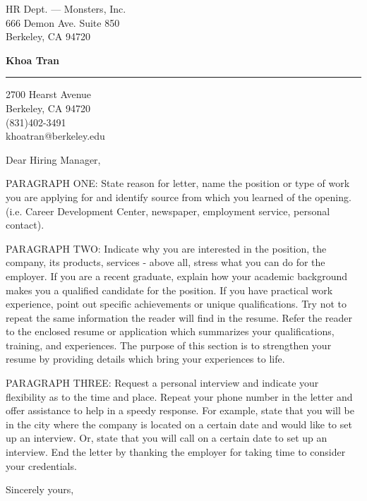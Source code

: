 \documentclass{letter} %
\begin{document}
\longindentation=0pt                       %
\let\raggedleft\raggedright                %
 
\begin{letter}{HR Dept. --- Monsters, Inc. \\
666 Demon Ave. Suite 850 \\
Berkeley, CA 94720}

\begin{center}
{\large\bf Khoa Tran} 
\end{center}
\medskip\hrule height 0.3pt
\begin{center}
{2700 Hearst Avenue \\   
Berkeley, CA 94720 \\ 
(831)402-3491 \\ 
khoatran@berkeley.edu} 
\end{center} \vfill %
 
\opening{Dear Hiring Manager,} 
 
\noindent PARAGRAPH ONE: State reason for letter, name the position or type 
of work you are applying for and identify source from  which  you 
learned   of   the  opening.  (i.e.  Career  Development  Center, 
newspaper, employment service, personal contact). 
 
\noindent PARAGRAPH  TWO:  Indicate why you are interested in the position, 
the company, its products, services - above all, stress what  you 
can  do  for  the employer. If you are a recent graduate, explain 
how your academic background makes you a qualified candidate  for 
the  position.  If  you have practical work experience, point out 
specific achievements or unique qualifications. Try not to repeat 
the  same  information  the reader will find in the resume. Refer 
the reader to the enclosed resume or application which summarizes 
your  qualifications,  training,  and experiences. The purpose of 
this section is to strengthen your resume  by  providing  details 
which bring your experiences to life. 
 
\noindent PARAGRAPH THREE: Request a personal interview and  indicate  your 
flexibility as to the time and place. Repeat your phone number in 
the letter and offer assistance to help in a speedy response. For 
example,  state that you will be in the city where the company is 
located on a certain date and would like to set up an  interview. 
Or,  state  that  you  will  call  on a certain date to set up an 
interview. End the letter by thanking  the  employer  for  taking 
time to consider your credentials. 
 
\closing{Sincerely yours, }

\end{letter}
\end{document}
